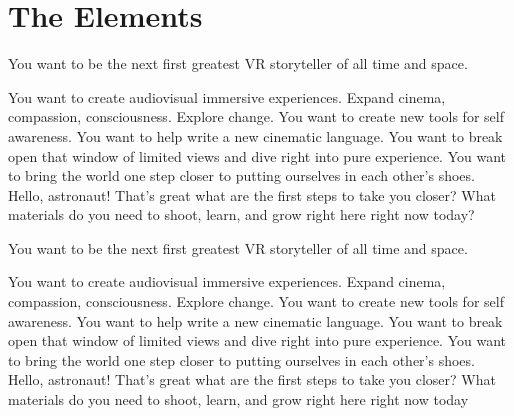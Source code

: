 \chapter{The Elements}
\pagecolor{white}
\label{chap:1}
\begin{fullwidth}


\problem

{\large You want to be the next first greatest VR storyteller of all time and space. \par}

You want to create audiovisual immersive experiences. Expand cinema, compassion, consciousness. Explore change. You want to create new tools for self awareness. You want to help write a new cinematic language. You want to break open that window of limited views and dive right into pure experience. You want to bring the world one step closer to putting ourselves in each other's shoes. Hello, astronaut! That's great what are the first steps to take you closer? What materials do you need to shoot, learn, and grow right here right now today?

\solution

{\large You want to be the next first greatest VR storyteller of all time and space. \par}

You want to create audiovisual immersive experiences. Expand cinema, compassion, consciousness. Explore change. You want to create new tools for self awareness. You want to help write a new cinematic language. You want to break open that window of limited views and dive right into pure experience. You want to bring the world one step closer to putting ourselves in each other's shoes. Hello, astronaut! That's great what are the first steps to take you closer? What materials do you need to shoot, learn, and grow right here right now today

\clearpage

\end{fullwidth}